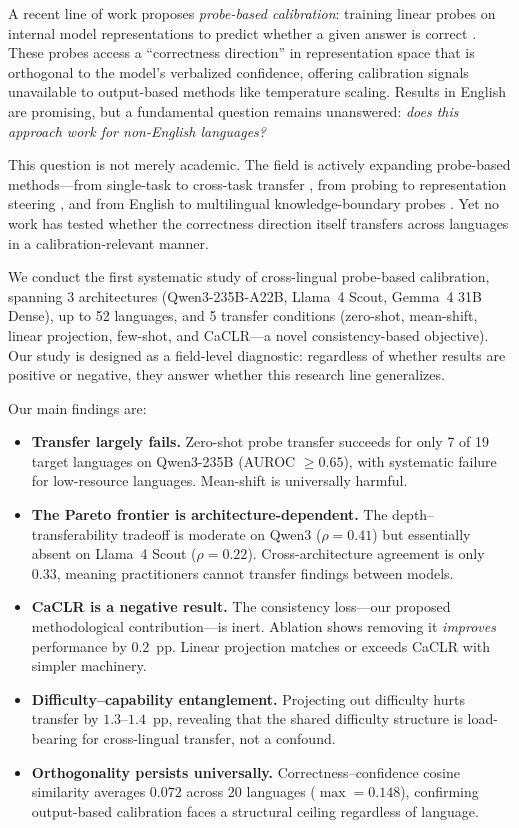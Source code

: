 \documentclass[11pt,a4paper]{article}
\begin{document}
A recent line of work proposes \emph{probe-based calibration}: training linear probes on internal model representations to predict whether a given answer is correct \citep{miao-etal-2024-coral,burns2023discovering,miao-ungar-2026}.
These probes access a ``correctness direction'' in representation space that is orthogonal to the model's verbalized confidence, offering calibration signals unavailable to output-based methods like temperature scaling.
Results in English are promising, but a fundamental question remains unanswered: \emph{does this approach work for non-English languages?}

This question is not merely academic.
The field is actively expanding probe-based methods---from single-task to cross-task transfer \citep{miao-etal-2024-coral}, from probing to representation steering \citep{miao-ungar-2026}, and from English to multilingual knowledge-boundary probes \citep{xiao-etal-2025}.
Yet no work has tested whether the correctness direction itself transfers across languages in a calibration-relevant manner.

We conduct the first systematic study of cross-lingual probe-based calibration, spanning 3 architectures (Qwen3-235B-A22B, Llama~4 Scout, Gemma~4 31B Dense), up to 52 languages, and 5 transfer conditions (zero-shot, mean-shift, linear projection, few-shot, and CaCLR---a novel consistency-based objective).
Our study is designed as a field-level diagnostic: regardless of whether results are positive or negative, they answer whether this research line generalizes.

Our main findings are:
\begin{itemize}
\item \textbf{Transfer largely fails.} Zero-shot probe transfer succeeds for only 7 of 19 target languages on Qwen3-235B (AUROC $\geq 0.65$), with systematic failure for low-resource languages. Mean-shift is universally harmful.
\item \textbf{The Pareto frontier is architecture-dependent.} The depth--transferability tradeoff is moderate on Qwen3 ($\rho{=}0.41$) but essentially absent on Llama~4 Scout ($\rho{=}0.22$). Cross-architecture agreement is only $0.33$, meaning practitioners cannot transfer findings between models.
\item \textbf{CaCLR is a negative result.} The consistency loss---our proposed methodological contribution---is inert. Ablation shows removing it \emph{improves} performance by $0.2$~pp. Linear projection matches or exceeds CaCLR with simpler machinery.
\item \textbf{Difficulty--capability entanglement.} Projecting out difficulty hurts transfer by $1.3$--$1.4$~pp, revealing that the shared difficulty structure is load-bearing for cross-lingual transfer, not a confound.
\item \textbf{Orthogonality persists universally.} Correctness--confidence cosine similarity averages $0.072$ across 20 languages ($\max{=}0.148$), confirming output-based calibration faces a structural ceiling regardless of language.
\end{itemize}
\end{document}
